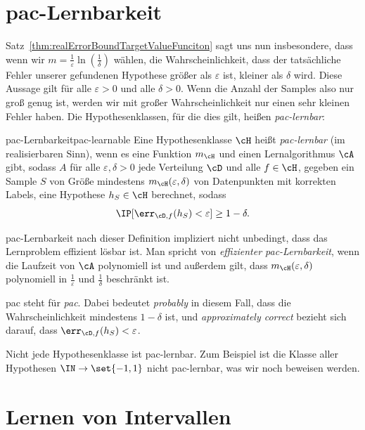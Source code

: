 \documentclass[language=ngerman,algolist,acrolist]{TemplateLecture}
\begin{document}
\section{\acs{pac}-Lernbarkeit}
Satz~\ref{thm:realErrorBoundTargetValueFunciton} sagt uns nun insbesondere, dass wenn wir $m = \frac{1}{\varepsilon} \ln\left( \frac{1}{\delta} \right)$ wählen, die Wahrscheinlichkeit, dass der tatsächliche Fehler unserer gefundenen Hypothese größer als $\varepsilon$ ist, kleiner als $\delta$ wird. Diese Aussage gilt für alle $\varepsilon > 0$ und alle $\delta > 0$. Wenn die Anzahl der Samples also nur groß genug ist, werden wir mit großer Wahrscheinlichkeit nur einen sehr kleinen Fehler haben. Die Hypothesenklassen, für die dies gilt, heißen \emph{\ac{pac}-lernbar}:

\begin{defi}{\ac{pac}-Lernbarkeit}{pac-learnable}
    Eine Hypothesenklasse $\cH$ heißt \emph{\ac{pac}-lernbar} (im realisierbaren Sinn), wenn es eine Funktion $m_\cH$ und einen Lernalgorithmus $\cA$ gibt, sodass $A$ für alle $\varepsilon, \delta > 0$ jede Verteilung $\cD$ und alle $f \in \cH$, gegeben ein Sample $S$ von Größe mindestens $m_\cH(\varepsilon, \delta)$ von Datenpunkten mit korrekten Labels, eine Hypothese $h_S \in \cH$ berechnet, sodass 
    \begin{equation*}
        \IP[\err_{\cD, f}(h_S) < \varepsilon] \geq 1 - \delta.
    \end{equation*}
\end{defi}

\ac{pac}-Lernbarkeit nach dieser Definition impliziert nicht unbedingt, dass das Lernproblem effizient lösbar ist. Man spricht von \emph{effizienter \ac{pac}-Lernbarkeit}, wenn die Laufzeit von $\cA$ polynomiell ist und außerdem gilt, dass $m_\cH(\varepsilon, \delta)$ polynomiell in $\frac{1}{\varepsilon}$ und $\frac{1}{\delta}$ beschränkt ist.

\acs{pac} steht für \emph{\acl{pac}}. Dabei bedeutet \emph{probably} in diesem Fall, dass die Wahrscheinlichkeit mindestens $1 - \delta$ ist, und \emph{approximately correct} bezieht sich darauf, dass $\err_{\cD, f}(h_S) < \varepsilon$.

Nicht jede Hypothesenklasse ist \ac{pac}-lernbar. Zum Beispiel ist die Klasse aller Hypothesen $\IN \to \set{-1, 1}$ nicht \ac{pac}-lernbar, was wir noch beweisen werden.

\section{Lernen von Intervallen}
\end{document}
